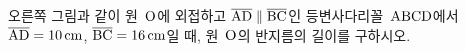 \noindent\begin{minipage}[t]{0.58\linewidth}\vspace{0pt}\raggedright 오른쪽 그림과 같이 원~$\mathrm{O}$에 외접하고 $\overline{\mathrm{AD}}\parallel\overline{\mathrm{BC}}$인 등변사다리꼴~$\mathrm{ABCD}$에서 $\overline{\mathrm{AD}}=10\,\mathrm{cm}$, $\overline{\mathrm{BC}}=16\,\mathrm{cm}$일 때, 원~$\mathrm{O}$의 반지름의 길이를 구하시오.\end{minipage}\hfill\begin{minipage}[t]{0.4\linewidth}\vspace{0pt}\centering \resizebox{\ifdim\width>\linewidth\linewidth\else\width\fi}{!}{}\end{minipage}\par
